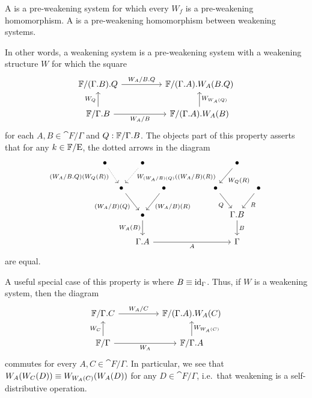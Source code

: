 \begin{defn}
A  is a pre-weakening system for which every $W_f$ is a
pre-weakening homomorphism. A  is a pre-weakening 
homomorphism between weakening systems.
\end{defn}

\begin{rmk}
In other words, a weakening system is a pre-weakening system with a weakening
structure $W$ for which the square
\begin{equation*}
\begin{tikzcd}[column sep=huge]
\cat{F}/\ctxext{{\Gamma}{B}}{Q}
  \arrow[r,"W_A/\ctxext{B}{Q}"]
  &
\cat{F}/\ctxext{{\Gamma}{A}}{W_A(\ctxext{B}{Q})}
  \\
\cat{F}/\ctxext{\Gamma}{B}
  \arrow[u,"W_Q"]
  \arrow[r,swap,"W_A/B"]
  &
\cat{F}/\ctxext{{\Gamma}{A}}{W_A(B)}
  \arrow[u,swap,"W_{W_A(Q)}"]
\end{tikzcd}
\end{equation*}
for each $A,B\in\cat{F}/\Gamma$ and $Q:\cat{F}/\ctxext{\Gamma}{B}$. The objects part of this 
property asserts that for any $k\in \mathbb{F}/\mathrm{E}$, the dotted arrows in the diagram
\begin{equation*}
\begin{tikzcd}[column sep=tiny]
\bullet \arrow[dr,densely dotted,swap,near start,"(W_A/\ctxext{B}{Q})(W_Q(R))"] & & \bullet \arrow[dl,densely dotted,near start,"W_{(W_A/B)(Q)}((W_A/B)(R))"] & & & & & & & & & & \bullet \arrow[dl,"W_Q(R)"] \\
& \bullet \arrow[dr,swap,"(W_A/B)(Q)"] & & \bullet \arrow[dl,"(W_A/B)(R)"] & & & & & & & & \bullet \arrow[dr,swap,"Q"] & & \bullet \arrow[dl,"R"] \\
& & \bullet \arrow[d,swap,"W_A(B)"] & & & & & & & & & & \ctxext{\Gamma}{B} \arrow[d,"B"] \\
& & \ctxext{\Gamma}{A} \arrow[rrrrrrrrrr,swap,"A"] & & & & & & & & & & \Gamma
\end{tikzcd}
\end{equation*}
are equal.

A useful special case of this property is where $B\equiv {\mathrm{id}_{\Gamma}}$. Thus, if $W$ is
a weakening system, then the diagram
\begin{equation*}
\begin{tikzcd}[column sep=huge]
\cat{F}/\ctxext{\Gamma}{C}
  \arrow[r,"W_A/C"]
  &
\cat{F}/\ctxext{{\Gamma}{A}}{W_A(C)}
  \\
\cat{F}/\Gamma
  \arrow[u,"W_C"]
  \arrow[r,swap,"W_A"]
  &
\cat{F}/\ctxext{\Gamma}{A}
  \arrow[u,swap,"W_{W_A(C)}"]
\end{tikzcd}
\end{equation*}
commutes for every $A,C\in\cat{F}/\Gamma$. In particular, we see
that $W_A(W_C(D))\equiv W_{W_A(C)}(W_A(D))$ for any $D\in\cat{F}/\Gamma$,
i.e.~that weakening is a self-distributive operation. 
\end{rmk}


